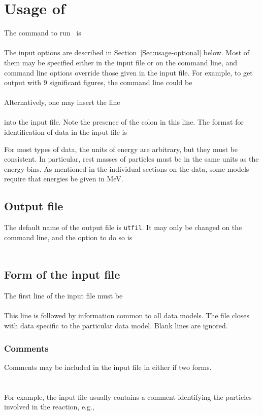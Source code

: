 \chapter{Usage of \gettransfer}
\label{Sec:usage}
The command to run \gettransfer\ is\\
  \\
The input options are described in Section~\ref{Sec:usage-optional} below.
Most of them may be specified either in the input file or on the
command line, and command line options override those given in the
input file.  For example, to get output with 9 significant figures,
the command line could be\\
\\
Alternatively, one may insert the line\\
   \\
into the input file.  Note the presence of the colon in this line.
The format for identification of data in the input file is\\

For most types of data, the units of energy are arbitrary, but they
must be consistent.  In particular, rest masses of particles must
be in the same units as the energy bins.  As mentioned in the
individual sections on the data, some models require that
energies be given in MeV.

\section{Output file}
The default name of the output file is \texttt{utfil}.  
It may only be changed on the command line,  and the option to do so is\\
  \\

\section{Form of the input file}
The first line of the input file must be\\
  \\
This line is followed by information common to all data models.
The file closes with data specific to the particular data model.
Blank lines are ignored.
  
\subsection{Comments}
Comments may be included in the input file in either if two forms.\\
 \\
 \\
 For example, the input file usually contains a comment identifying the
 particles involved in the reaction, e.g.,\\
 
